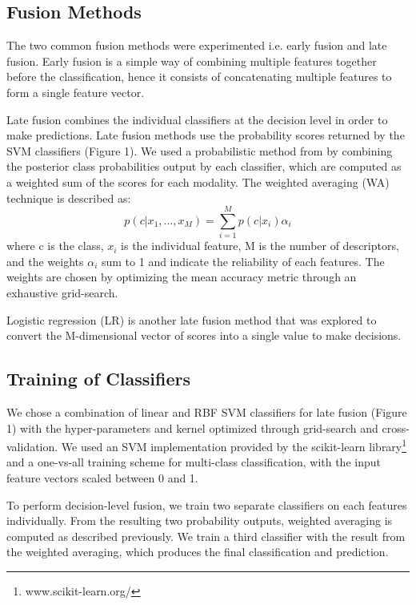 \documentclass[MIRU]{miru2015e}
\begin{document}
\subsection{Fusion Methods}
The two common fusion methods were experimented i.e. early fusion and late fusion. Early fusion is a simple way of combining multiple features together before the classification, hence it consists of concatenating multiple features to form a single feature vector. 

Late fusion combines the individual classifiers at the decision level in order to make predictions. Late fusion methods use the probability scores returned by the SVM classifiers (Figure 1). We used a probabilistic method from \cite{latefusion} by combining the posterior class probabilities output by each classifier, which are computed as a weighted sum of the scores for each modality. The weighted averaging (WA) technique is described as:
\[p(c|x_{1}, ..., x_{M}) = \sum\limits_{i=1}^M p(c | x_{i}) \alpha_{i}\]
 where c is the class,  $x_{i}$ is the individual feature,  M is the number of descriptors, and the weights \(\alpha_{i}\) sum to 1 and indicate the reliability of each features. The weights are chosen by optimizing the mean accuracy metric through an exhaustive grid-search.

Logistic regression (LR) is another late fusion method that was explored to convert the M-dimensional vector of scores into a single value to make decisions.

\subsection{Training of Classifiers}

We chose a combination of linear and RBF SVM classifiers for late fusion (Figure 1) with the hyper-parameters and kernel optimized through grid-search and cross-validation. We used an SVM implementation provided by the scikit-learn library\footnote{www.scikit-learn.org/} and a one-vs-all training scheme for multi-class classification, with the input feature vectors scaled between 0 and 1.

To perform decision-level fusion, we train two separate classifiers on each features individually. From the resulting two probability outputs, weighted averaging is computed as described previously. We train a third classifier with the result from the weighted averaging, which produces the final classification and prediction.	
\end{document}
